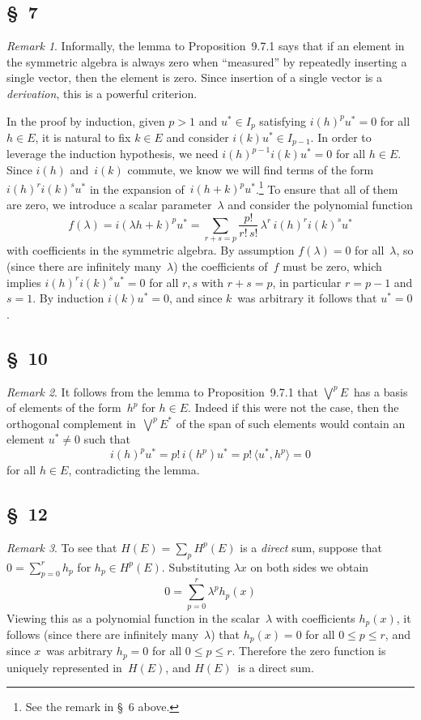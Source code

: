 \documentclass[letterpaper,12pt]{article}
\newcommand{\bigsmprod}{\bigvee}
\newcommand{\medsmprod}{{\textstyle\bigsmprod}}
\newcommand{\sprod}[2]{\langle#1,#2\rangle}
\theoremstyle{definition}
\theoremstyle{remark}
\newtheorem*{rmk}{Remark}
\begin{document}
\subsection*{\S~7}
\begin{rmk}
Informally, the lemma to Proposition~9.7.1 says that if an element in the symmetric algebra is always zero when ``measured'' by repeatedly inserting a single vector, then the element is zero. Since insertion of a single vector is a \emph{derivation}, this is a powerful criterion.

In the proof by induction, given \(p>1\) and \(u^*\in I_p\) satisfying \(i(h)^p u^*=0\) for all \(h\in E\), it is natural to fix \(k\in E\) and consider \(i(k)u^*\in I_{p-1}\). In order to leverage the induction hypothesis, we need \(i(h)^{p-1}i(k)u^*=0\) for all \(h\in E\). Since \(i(h)\) and~\(i(k)\) commute, we know we will find terms of the form \(i(h)^ri(k)^su^*\) in the expansion of~\(i(h+k)^pu^*\).\footnote{See the remark in \S~6 above.} To ensure that all of them are zero, we introduce a scalar parameter~\(\lambda\) and consider the polynomial function
\[f(\lambda)=i(\lambda h+k)^pu^*=\sum_{r+s=p}\frac{p!}{r!\,s!}\,\lambda^r\,i(h)^ri(k)^su^*\]
with coefficients in the symmetric algebra. By assumption \(f(\lambda)=0\) for all~\(\lambda\), so (since there are infinitely many~\(\lambda\)) the coefficients of~\(f\) must be zero, which implies \(i(h)^ri(k)^su^*=0\) for all \(r,s\) with \(r+s=p\), in particular \(r=p-1\) and \(s=1\). By induction \(i(k)u^*=0\), and since \(k\)~was arbitrary it follows that \(u^*=0\).
\end{rmk}

\subsection*{\S~10}
\begin{rmk}
It follows from the lemma to Proposition~9.7.1 that \(\medsmprod^p E\)~has a basis of elements of the form~\(h^p\) for \(h\in E\). Indeed if this were not the case, then the orthogonal complement in~\(\medsmprod^p E^*\) of the span of such elements would contain an element \(u^*\ne 0\) such that
\[i(h)^pu^*=p!\,i(h^p)u^*=p!\,\sprod{u^*}{h^p}=0\]
for all \(h\in E\), contradicting the lemma.
\end{rmk}

\subsection*{\S~12}
\begin{rmk}
To see that \(H(E)=\sum_p H^p(E)\) is a \emph{direct} sum, suppose that \(0=\sum_{p=0}^r h_p\) for \(h_p\in H^p(E)\). Substituting \(\lambda x\) on both sides we obtain
\[0=\sum_{p=0}^r \lambda^p h_p(x)\]
Viewing this as a polynomial function in the scalar~\(\lambda\) with coefficients \(h_p(x)\), it follows (since there are infinitely many~\(\lambda\)) that \(h_p(x)=0\) for all \(0\le p\le r\), and since \(x\)~was arbitrary \(h_p=0\) for all \(0\le p\le r\). Therefore the zero function is uniquely represented in~\(H(E)\), and \(H(E)\)~is a direct sum.
\end{rmk}
\end{document}
